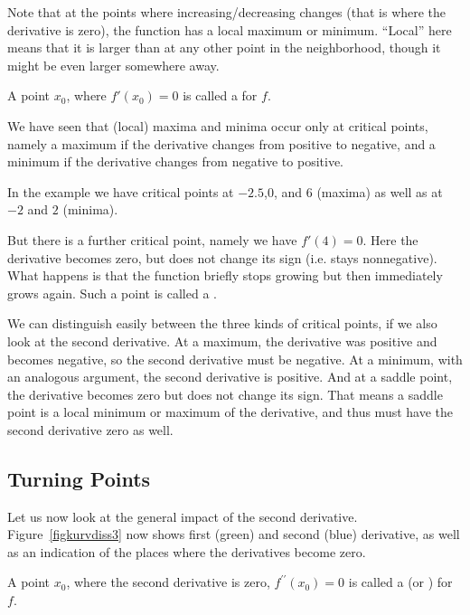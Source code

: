 Note that at the points where increasing/decreasing changes (that is where
the derivative is zero), the function has a local maximum or minimum.
``Local'' here
means that it is larger than at any other point in the neighborhood, though
it might be even larger somewhere away.
\begin{defn}
A point $x_0$, where $f'(x_0)=0$ is called a  for
$f$.
\end{defn}
We have seen that (local) maxima and minima occur only at critical points,
namely a maximum if the derivative changes from positive to negative, and a
minimum if the derivative changes from negative to positive.

In the example we have critical points at $-2.5$,$0$, and $6$ (maxima) as
well as at $-2$ and $2$ (minima).

But there is a further critical point,
namely we have $f'(4)=0$. Here the derivative becomes zero, but does not
change its sign (i.e. stays nonnegative). What happens is that the function
briefly stops growing but then immediately grows again. Such a point is
called a .

We can distinguish easily between the three kinds of critical points, if we
also look at the second derivative. At a maximum, the derivative was
positive and becomes negative, so the second derivative must be negative.
At a minimum, with an analogous argument, the second derivative is positive.
And at a saddle point, the derivative becomes zero but does not change its
sign. That means a saddle point is a local minimum or maximum of the
derivative, and thus must have the second derivative zero as well.
\subsection{Turning Points}

Let us now look at the general impact of the second derivative.
Figure~\ref{figkurvdiss3} now shows first (green) and second (blue)
derivative, as well as an indication of the places where the derivatives
become zero.
\begin{defn}
A point $x_0$, where the second derivative is zero,
$f^{\prime\prime}(x_0)=0$ is called a  (or
) for $f$.
\end{defn}

